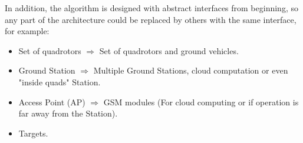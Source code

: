 In addition, the algorithm is designed with abstract interfaces from beginning, so any part of the architecture could be replaced by others with the same interface, for example:

\begin{itemize}
  \item Set of quadrotors $\Longrightarrow$ Set of quadrotors and ground vehicles.
  \item Ground Station $\Longrightarrow$ Multiple Ground Stations, cloud computation \cite{Cloud_computing} or even "inside quads" Station.
  \item Access Point (AP) $\Longrightarrow$ GSM modules (For cloud computing or if operation is far away from the Station).
  \item Targets.
\end{itemize}


